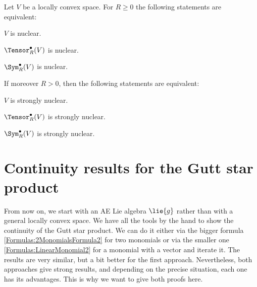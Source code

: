 \begin{proposition}
	\label{LCAna:Nuclearity}
	Let $V$ be a locally convex space. For $R \geq 0$ the following statements 
	are equivalent:
	\begin{propositionlist}
	  \item
		$V$ is nuclear.
	  \item
	  	$\Tensor_R^{\bullet}(V)$ is nuclear.
	  \item
	  	$\Sym_R^{\bullet}(V)$ is nuclear.	  	
	\end{propositionlist}
	If moreover $R > 0$, then the following statements are equivalent:
	\begin{propositionlist}
	  \item
		$V$ is strongly nuclear.
	  \item
	  	$\Tensor_R^{\bullet}(V)$ is strongly nuclear.
	  \item
	  	$\Sym_R^{\bullet}(V)$ is strongly nuclear.
	\end{propositionlist}
\end{proposition}




\section{Continuity results for the Gutt star product}
\label{sec:chap5_TopologyStar}

From now on, we start with an AE Lie algebra $\lie{g}$ rather than with a 
general locally convex space. We have all the tools by the hand to show the 
continuity of the Gutt star product. We can do it either via the bigger 
formula \eqref{Formulas:2MonomialsFormula2} for two monomials or via the 
smaller one \eqref{Formulas:LinearMonomial2} for a monomial with a 
vector and iterate it. The results are very similar, but a bit better for the 
first approach. Nevertheless, both approaches give strong results, and 
depending on the precise situation, each one has its advantages. This is why 
we want to give both proofs here.


